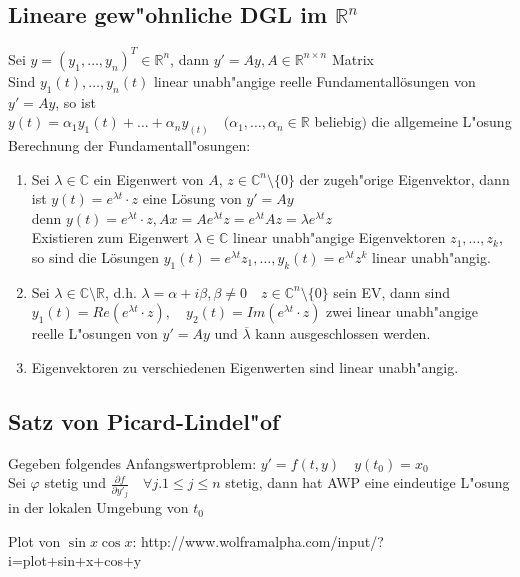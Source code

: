 \documentclass[10pt,a4paper^, twocolumn]{article}
\newcommand{\menge}{\mathbb} %
\renewcommand{\phi}{\varphi} %
\begin{document}
\subsection{Lineare gew"ohnliche DGL im $\menge{R}^n$}
	Sei $y = (y_1,\dots,y_n)^T \in \menge{R}^n$, dann $y' = Ay, A \in \menge{R}^{n\times n}$ Matrix \\
	Sind $y_1(t),\dots,y_n(t)$ linear unabh"angige reelle Fundamentallösungen von $y' = Ay$,
	so ist \\
	$y(t) = \alpha_1 y_1(t)+\dots+\alpha_ny_(t) \quad (\alpha_1,\dots,\alpha_n \in \menge{R}$ beliebig$)$ die allgemeine L"osung\\
	Berechnung der Fundamentall"osungen:
	\begin{enumerate}
	\item{} Sei $\lambda \in \menge{C}$ ein Eigenwert von $A$, $z \in \menge{C}^n \setminus \{0\}$ der zugeh"orige Eigenvektor,
		dann ist $y(t) = e^{\lambda t} \cdot z$ eine Lösung von $y' = Ay$  \\
		denn $y(t) = e^{\lambda t} \cdot z, Ax = Ae^{\lambda t}z = e^{\lambda t}Az = \lambda e^{\lambda t}z$ \\
		Existieren zum Eigenwert $\lambda \in \menge{C}$ linear unabh"angige Eigenvektoren $z_1,\dots,z_k$, so sind die Lösungen
		$y_1(t) = e^{\lambda t}z_1, \dots, y_k(t) = e^{\lambda t}z^k$ linear unabh"angig.
	\item{} Sei $\lambda \in \menge{C} \setminus \menge{R}$, d.h. $\lambda = \alpha + i\beta, \beta \neq 0 \quad z \in \menge{C}^n \setminus \{0\}$ sein EV,
		dann sind $y_1(t) = Re(e^{\lambda t} \cdot z), \quad y_2(t) = Im(e^{\lambda t} \cdot z)$ zwei linear unabh"angige reelle L"osungen von $y' = Ay$ 
		und $\overline\lambda$ kann ausgeschlossen werden.
	\item{} Eigenvektoren zu verschiedenen Eigenwerten sind linear unabh"angig.
	\end{enumerate}

\subsection{Satz von Picard-Lindel"of}
	Gegeben folgendes Anfangswertproblem: $y' = f(t,y) \quad y(t_0) = x_0$ \\
	Sei $\phi$ stetig und $\frac{\partial f}{\partial y'_j} \quad \forall j.1 \leq j \leq n$ stetig,
	dann hat AWP eine eindeutige L"osung in der lokalen Umgebung von $t_0$


Plot von $\sin x \cos x$: http://www.wolframalpha.com/input/?i=plot+sin+x+cos+y





%
%
%
%
%
%
%
%
\end{document}
